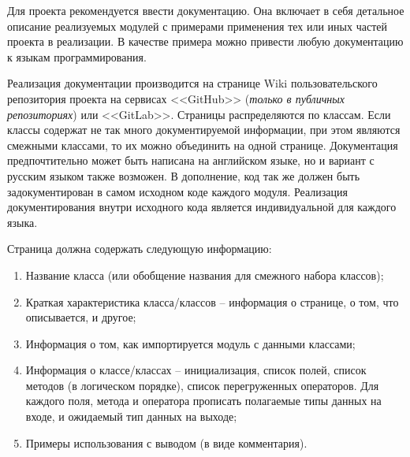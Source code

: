 	Для проекта рекомендуется ввести документацию. Она включает в себя детальное описание реализуемых модулей с примерами применения тех или иных частей проекта в реализации. В качестве примера можно привести любую документацию к языкам программирования.

	Реализация документации производится на странице Wiki пользовательского репозитория проекта на сервисах <<GitHub>> (\textit{только в публичных репозиториях}) или <<GitLab>>. Страницы распределяются по классам. Если классы содержат не так много документируемой информации, при этом являются смежными классами, то их можно объединить на одной странице. Документация предпочтительно может быть написана на английском языке, но и вариант с русским языком также возможен. В дополнение, код так же должен быть задокументирован в самом исходном коде каждого модуля. Реализация документирования внутри исходного кода является индивидуальной для каждого языка.

	Страница должна содержать следующую информацию:
	\begin{enumerate}
		\item Название класса (или обобщение названия для смежного набора классов);
		\item Краткая характеристика класса/классов -- информация о странице, о том, что описывается, и другое;
		\item Информация о том, как импортируется модуль с данными классами;
		\item Информация о классе/классах -- инициализация, список полей, список методов (в логическом порядке), список перегруженных операторов. Для каждого поля, метода и оператора прописать полагаемые типы данных на входе, и ожидаемый тип данных на выходе;
		\item Примеры использования с выводом (в виде комментария).
	\end{enumerate}

